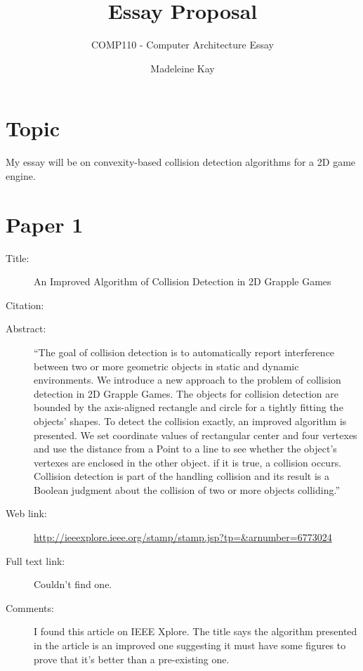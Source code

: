 \documentclass{scrartcl}
\title{Essay Proposal}
\subtitle{COMP110 - Computer Architecture Essay}
\author{Madeleine Kay}
\begin{document}
\maketitle

\section*{Topic}

My essay will be on convexity-based collision detection algorithms for a 2D game engine.

\section*{Paper 1}
\begin{description}
\item[Title:] An Improved Algorithm of Collision Detection in 2D Grapple Games
\item[Citation:] \cite{guo}
\item[Abstract:] ``The goal of collision detection is to automatically report interference between two or more geometric objects in static and dynamic environments. We introduce a new approach to the problem of collision detection in 2D Grapple Games. The objects for collision detection are bounded by the axis-aligned rectangle and circle for a tightly fitting the objects' shapes. To detect the collision exactly, an improved algorithm is presented. We set coordinate values of rectangular center and four vertexes and use the distance from a Point to a line to see whether the object's vertexes are enclosed in the other object. if it is true, a collision occurs. Collision detection is part of the handling collision and its result is a Boolean judgment about the collision of two or more objects colliding.''
\item[Web link:] \url{http://ieeexplore.ieee.org/stamp/stamp.jsp?tp=&arnumber=6773024}
\item[Full text link:] Couldn't find one.
\item[Comments:] I found this article on IEEE Xplore. The title says the algorithm presented in the article is an improved one suggesting it must have some figures to prove that it's better than a pre-existing one. 
\end{description}
\end{document}
